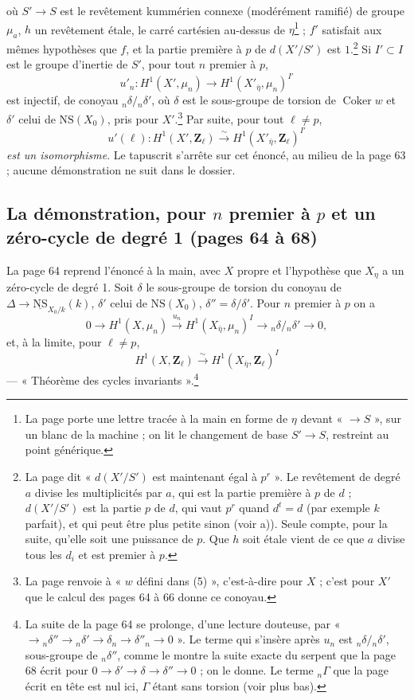 \documentclass[11pt,a4paper]{article}
\begin{document}
où $S' \to S$ est le revêtement kummérien connexe (modérément ramifié) de groupe
$\mu_a$, $h$ un revêtement étale, le carré cartésien au-dessus de
$\eta$\footnote{La page porte une lettre tracée à la main en forme de $\eta$ devant
« $\to S$ », sur un blanc de la machine ; on lit le changement de base $S' \to
S$, restreint au point générique.} ; $f'$ satisfait aux mêmes hypothèses que $f$,
et la partie première à $p$ de $d(X'/S')$ est $1$.\footnote{La page dit
« $d(X'/S')$ est maintenant égal à $p^r$ ». Le revêtement de degré $a$ divise les
multiplicités par $a$, qui est la partie première à $p$ de $d$ ; $d(X'/S')$ est la
partie $p$ de $d$, qui vaut $p^r$ quand $d^t = d$ (par exemple $k$ parfait), et
qui peut être plus petite sinon (voir a)). Seule compte, pour la suite, qu'elle
soit une puissance de $p$. Que $h$ soit étale vient de ce que $a$ divise tous les
$d_i$ et est premier à $p$.} Si $I' \subset I$ est le groupe d'inertie de $S'$,
pour tout $n$ premier à $p$,
\[ u'_n\colon H^1(X', \mu_n) \to H^1(X'_{\bar\eta}, \mu_n)^{I'} \]
est injectif, de conoyau ${}_n\delta/{}_n\delta'$, où $\delta$ est le
sous-groupe de torsion de $\operatorname{Coker} w$ et $\delta'$ celui de
$\mathrm{NS}(X_0)$, pris pour $X'$.\footnote{La page renvoie à « $w$ défini dans
(5) », c'est-à-dire pour $X$ ; c'est pour $X'$ que le calcul des pages 64 à 66
donne ce conoyau.} Par suite, pour tout $\ell \neq p$,
\[ u'(\ell)\colon H^1(X', \mathbf{Z}_\ell) \xrightarrow{\sim} H^1(X'_{\bar\eta},
\mathbf{Z}_\ell)^{I'} \]
\emph{est un isomorphisme}. Le tapuscrit s'arrête sur cet énoncé, au milieu de la
page 63 ; aucune démonstration ne suit dans le dossier.

\subsection*{La démonstration, pour $n$ premier à $p$ et un zéro-cycle de degré 1 (pages 64 à 68)}

La page 64 reprend l'énoncé à la main, avec $X$ propre et l'hypothèse que $X_\eta$
a un zéro-cycle de degré 1. Soit $\delta$ le sous-groupe de torsion du conoyau de
$\Delta \to \underline{\mathrm{NS}}_{X_0/k}(k)$, $\delta'$ celui de
$\mathrm{NS}(X_0)$, $\delta'' = \delta/\delta'$. Pour $n$ premier à $p$ on a
\[ 0 \to H^1(X, \mu_n) \xrightarrow{u_n} H^1(X_{\bar\eta}, \mu_n)^I \to
{}_n\delta/{}_n\delta' \to 0 , \]
et, à la limite, pour $\ell \neq p$,
\[ H^1(X, \mathbf{Z}_\ell) \xrightarrow{\sim} H^1(X_{\bar\eta},
\mathbf{Z}_\ell)^I \]
--- « Théorème des cycles invariants ».\footnote{La suite de la page 64 se
prolonge, d'une lecture douteuse, par « $\to {}_n\delta'' \to {}_n\delta' \to
\delta_n \to \delta''_n \to 0$ ». Le terme qui s'insère après $u_n$ est
${}_n\delta/{}_n\delta'$, sous-groupe de ${}_n\delta''$, comme le montre la suite
exacte du serpent que la page 68 écrit pour $0 \to \delta' \to \delta \to \delta''
\to 0$ ; on le donne. Le terme ${}_n\Gamma$ que la page écrit en tête est nul ici,
$\Gamma$ étant sans torsion (voir plus bas).}
\end{document}
